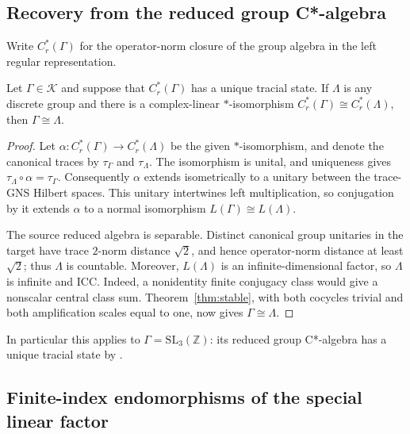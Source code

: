 \subsection{Recovery from the reduced group C*-algebra}

Write $C_r^*(\Gamma)$ for the operator-norm closure of the group algebra
in the left regular representation.
\begin{corollary}\label{cor:reduced-cstar}
Let $\Gamma\in\mathscr K$ and suppose that $C_r^*(\Gamma)$ has a
unique tracial state. If $\Lambda$ is any discrete group and
there is a complex-linear $*$-isomorphism
$C_r^*(\Gamma)\cong C_r^*(\Lambda)$, then
$\Gamma\cong\Lambda$.
\end{corollary}
\begin{proof}
Let $\alpha:C_r^*(\Gamma)\to C_r^*(\Lambda)$ be the given
$*$-isomorphism, and denote the canonical traces by $\tau_\Gamma$
and $\tau_\Lambda$. The isomorphism is unital, and uniqueness gives
$\tau_\Lambda\circ\alpha=\tau_\Gamma$. Consequently $\alpha$
extends isometrically to a unitary between the trace-GNS Hilbert
spaces. This unitary intertwines left multiplication, so conjugation by
it extends $\alpha$ to a normal isomorphism
$L(\Gamma)\cong L(\Lambda)$.

The source reduced algebra is separable. Distinct canonical group
unitaries in the target have trace $2$-norm distance $\sqrt2$, and hence
operator-norm distance at least $\sqrt2$; thus $\Lambda$ is countable.
Moreover, $L(\Lambda)$ is an infinite-dimensional factor, so $\Lambda$
is infinite and ICC. Indeed, a nonidentity finite conjugacy class would
give a nonscalar central class sum. Theorem~\ref{thm:stable}, with both
cocycles trivial and both amplification scales equal to one, now gives
$\Gamma\cong\Lambda$.
\end{proof}

In particular this applies to $\Gamma=\mathrm{SL}_3(\mathbb Z)$:
its reduced group C*-algebra has a unique tracial state by
\cite[discussion following Corollary~5]{Bekka2007}.

\subsection{Finite-index endomorphisms of the special linear factor}

